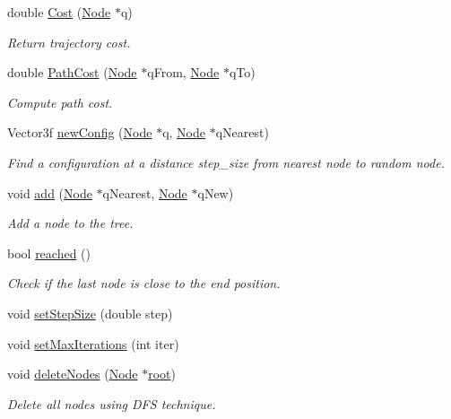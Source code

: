 \begin{DoxyCompactItemize}
double \hyperlink{classRRTSTAR_aff52d6be37b207ad4bef71430736fa06}{Cost} (\hyperlink{structNode}{Node} $\ast$q)
\begin{DoxyCompactList}\small\item\em Return trajectory cost. \end{DoxyCompactList}\item 
double \hyperlink{classRRTSTAR_aec4f110bd8cf010d2c86f235306996e7}{Path\+Cost} (\hyperlink{structNode}{Node} $\ast$q\+From, \hyperlink{structNode}{Node} $\ast$q\+To)
\begin{DoxyCompactList}\small\item\em Compute path cost. \end{DoxyCompactList}\item 
Vector3f \hyperlink{classRRTSTAR_a7519aad88048588ebc11bfb04a1c1b4a}{new\+Config} (\hyperlink{structNode}{Node} $\ast$q, \hyperlink{structNode}{Node} $\ast$q\+Nearest)
\begin{DoxyCompactList}\small\item\em Find a configuration at a distance step\+\_\+size from nearest node to random node. \end{DoxyCompactList}\item 
void \hyperlink{classRRTSTAR_a857eb7050319c4f0950724ae150e597b}{add} (\hyperlink{structNode}{Node} $\ast$q\+Nearest, \hyperlink{structNode}{Node} $\ast$q\+New)
\begin{DoxyCompactList}\small\item\em Add a node to the tree. \end{DoxyCompactList}\item 
bool \hyperlink{classRRTSTAR_a999e6db04aff2b7b5d3c66e50b3057b8}{reached} ()
\begin{DoxyCompactList}\small\item\em Check if the last node is close to the end position. \end{DoxyCompactList}\item 
void \hyperlink{classRRTSTAR_add28ae0f961e4fe1d35ebdfb95bf7365}{set\+Step\+Size} (double step)
\item 
void \hyperlink{classRRTSTAR_a3b0e2de2074b31567b8eb65a082de463}{set\+Max\+Iterations} (int iter)
\item 
void \hyperlink{classRRTSTAR_a8aa26cd3eab9eed58746ceaa5a7b68f0}{delete\+Nodes} (\hyperlink{structNode}{Node} $\ast$\hyperlink{classRRTSTAR_a93a4dad750b6a408269ca45a4b618d4e}{root})
\begin{DoxyCompactList}\small\item\em Delete all nodes using D\+FS technique. \end{DoxyCompactList}\item 

\end{DoxyCompactItemize}
